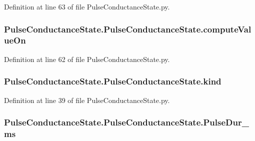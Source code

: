Definition at line 63 of file Pulse\-Conductance\-State.\-py.

\hypertarget{class_pulse_conductance_state_1_1_pulse_conductance_state_a7f6710b9f97ac5879888402cd5ed15d4}{
\subsubsection[{compute\-Value\-On}]{\setlength{\rightskip}{0pt plus 5cm}Pulse\-Conductance\-State.\-Pulse\-Conductance\-State.\-compute\-Value\-On}}\label{class_pulse_conductance_state_1_1_pulse_conductance_state_a7f6710b9f97ac5879888402cd5ed15d4}


Definition at line 62 of file Pulse\-Conductance\-State.\-py.

\hypertarget{class_pulse_conductance_state_1_1_pulse_conductance_state_a53d237daaa4815ad375e2377da89845e}{
\subsubsection[{kind}]{\setlength{\rightskip}{0pt plus 5cm}Pulse\-Conductance\-State.\-Pulse\-Conductance\-State.\-kind}}\label{class_pulse_conductance_state_1_1_pulse_conductance_state_a53d237daaa4815ad375e2377da89845e}


Definition at line 39 of file Pulse\-Conductance\-State.\-py.

\hypertarget{class_pulse_conductance_state_1_1_pulse_conductance_state_afda03b180fc3cb619de615632e725a6f}{
\subsubsection[{Pulse\-Dur\-\_\-ms}]{\setlength{\rightskip}{0pt plus 5cm}Pulse\-Conductance\-State.\-Pulse\-Conductance\-State.\-Pulse\-Dur\-\_\-ms}}\label{class_pulse_conductance_state_1_1_pulse_conductance_state_afda03b180fc3cb619de615632e725a6f}


